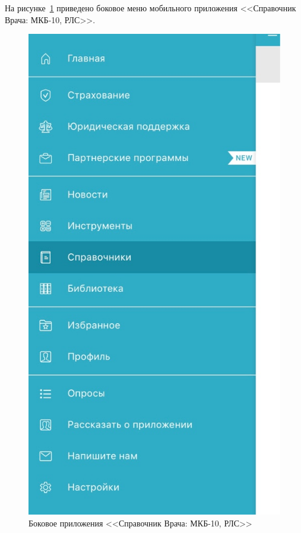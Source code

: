 \begin{enumerate}
    На рисунке~\ref{fig:fig04} приведено боковое меню мобильного приложения <<Справочник Врача: МКБ-10, РЛС>>.
     \begin{figure}
        \includegraphics[scale=0.6]{styles/diploma/inc/prog2.jpeg}
        \caption{Боковое приложения <<Справочник Врача: МКБ-10, РЛС>>}
        \label{fig:fig04}
    \end{figure}
    

\end{enumerate}

